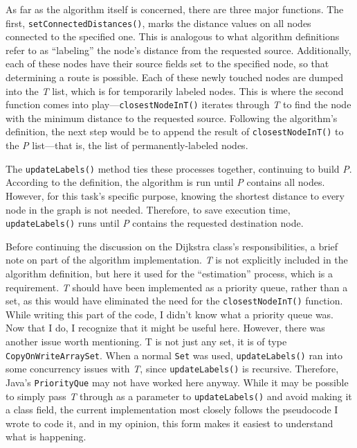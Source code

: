 \documentclass[12pt,letterpaper,titlepage]{article}   %
\begin{document}
As far as the algorithm itself is concerned, there are three major
functions. The first, \texttt{setConnectedDistances()}, marks the
distance values
on all nodes connected to the specified one. This is analogous to what
algorithm definitions refer to as ``labeling'' the node's distance from
the requested source. Additionally, each of these nodes have their
source fields set to the specified node, so that determining a route is
possible. Each of these newly touched nodes are dumped into the \emph{T}
list, which is for temporarily labeled nodes. This is where the second
function comes into play---\texttt{closestNodeInT()} iterates through
\emph{T} to find
the node with the minimum distance to the requested source. Following
the algorithm's definition, the next step would be to append the result
of \texttt{closestNodeInT()} to the \emph{P} list---that is, the list of
permanently-labeled nodes.

The \texttt{updateLabels()} method ties these processes together, continuing to
build \emph{P}. According to the definition, the algorithm is run until \emph{P}
contains all nodes. However, for this task's specific purpose, knowing
the shortest distance to every node in the graph is not needed.
Therefore, to save execution time, \texttt{updateLabels()} runs until
\emph{P} contains the requested destination node. 

Before continuing the discussion on the Dijkstra class's
responsibilities, a brief note on part of the algorithm implementation.
\emph{T} is not explicitly included in the algorithm definition, but here it
used for the ``estimation'' process, which is a requirement. \emph{T} should
have been implemented as a priority queue, rather than a set, as this
would have eliminated the need for the \texttt{closestNodeInT()} function. While
writing this part of the code, I didn't know what a priority queue was.
Now that I do, I recognize that it might be useful here. However, there
was another issue worth mentioning. T is not just any set, it is of type
\texttt{CopyOnWriteArraySet}. When a normal \texttt{Set} was used,
\texttt{updateLabels()} ran into some concurrency issues with \emph{T},
since \texttt{updateLabels()} is recursive.
Therefore, Java's \texttt{PriorityQue} may not have worked here anyway.
While it may be possible to simply pass \emph{T} through as a parameter
to \texttt{updateLabels()} and avoid making it a class field, the current
implementation most closely follows the pseudocode I wrote to code it,
and in my opinion, this form makes it easiest to understand what is happening.
\end{document}
